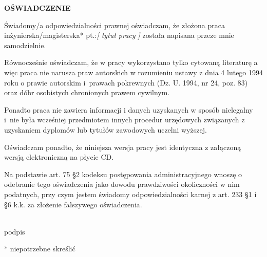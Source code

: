 \documentclass[a4paper,12pt,twoside]{book}
\begin{document}
    \vspace{3cm}
    \centerline{\large \textbf{OŚWIADCZENIE}}\vspace{1cm}
    
    Świadomy/a odpowiedzialności prawnej oświadczam, że złożona praca inżynierska/magisterska* pt.:\textit{[ tytuł pracy ]} została napisana przeze mnie samodzielnie. 
    
    Równocześnie oświadczam, że w pracy wykorzystano tylko cytowaną literaturę a więc praca nie narusza praw autorskich w rozumieniu ustawy z dnia 4 lutego 1994 roku o prawie autorskim i prawach pokrewnych (Dz. U. 1994, nr 24, poz. 83) oraz dóbr osobistych chronionych prawem cywilnym. 
    
    Ponadto praca nie zawiera informacji i danych uzyskanych w sposób nielegalny i nie była wcześniej przedmiotem innych procedur urzędowych związanych z uzyskaniem dyplomów lub tytułów zawodowych uczelni wyższej. 
    
    Oświadczam ponadto, że niniejsza wersja pracy jest identyczna z załączoną wersją elektroniczną na płycie CD.
    
    \begin{klauzula}
    \color{red} 
    Na podstawie art. 75 §2 kodeksu postępowania administracyjnego wnoszę o odebranie tego oświadczenia jako dowodu prawdziwości okoliczności w nim podatnych, przy czym jestem świadomy odpowiedzialności karnej z art. 233 §1 i §6 k.k. za złożenie fałszywego oświadczenia. 
    \end{klauzula}
    
    \vspace{1.5cm}
    \begin{flushright}
        \begin{minipage}{.5\linewidth}
            \begin{center}
                \dotfill \\
                podpis
            \end{center}
        \end{minipage}
    \end{flushright}
    
    \vfill
    \begin{flushleft}
    * niepotrzebne skreślić
    \end{flushleft}
    
    \newpage
    \tableofcontents
\end{document}
